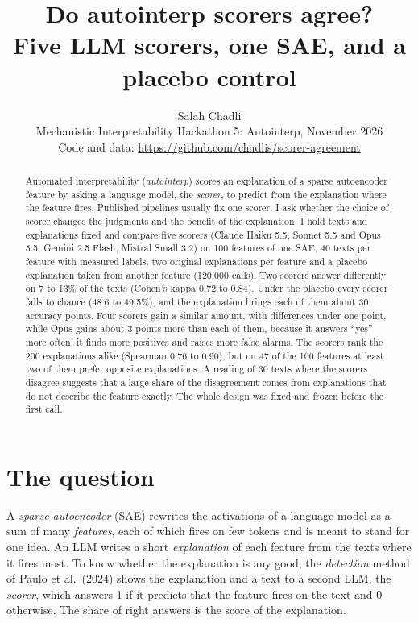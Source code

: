\documentclass[11pt]{article}
\title{Do autointerp scorers agree?\\[0.3em]
\large Five LLM scorers, one SAE, and a placebo control}
\author{Salah Chadli\\ \small Mechanistic Interpretability Hackathon 5: Autointerp, November 2026\\
\small Code and data: \url{https://github.com/chadlis/scorer-agreement}}
\date{}
\begin{document}
\maketitle

\begin{abstract}
\noindent Automated interpretability (\emph{autointerp}) scores an explanation of a
sparse autoencoder feature by asking a language model, the \emph{scorer}, to predict
from the explanation where the feature fires. Published pipelines usually fix one
scorer. I ask whether the choice of scorer changes the judgments and the benefit of
the explanation. I hold texts and explanations fixed and compare five scorers (Claude
Haiku 5.5, Sonnet 5.5 and Opus 5.5, Gemini 2.5 Flash, Mistral Small 3.2) on 100
features of one SAE, 40 texts per feature with measured labels, two original
explanations per feature and a placebo explanation taken from another feature
(120,000 calls). Two scorers answer differently on 7 to 13\% of the texts (Cohen's
kappa 0.72 to 0.84). Under the placebo every scorer falls to chance (48.6 to 49.5\%),
and the explanation brings each of them about 30 accuracy points. Four scorers gain
a similar amount, with differences under one point, while Opus gains about 3 points
more than each of them, because it answers ``yes'' more often: it finds more positives
and raises more false alarms. The scorers rank the 200 explanations alike (Spearman
0.76 to 0.90), but on 47 of the 100 features at least two of them prefer opposite
explanations. A reading of 30 texts where the scorers disagree suggests that a large
share of the disagreement comes from explanations that do not describe the feature
exactly. The whole design was fixed and frozen before the first call.
\end{abstract}

\section{The question}

A \emph{sparse autoencoder} (SAE) rewrites the activations of a language model as a
sum of many \emph{features}, each of which fires on few tokens and is meant to stand
for one idea. An LLM writes a short \emph{explanation} of each feature from the texts
where it fires most. To know whether the explanation is any good, the
\emph{detection} method of Paulo et al.\ (2024) shows the explanation and a text to a
second LLM, the \emph{scorer}, which answers 1 if it predicts that the feature fires
on the text and 0 otherwise. The share of right answers is the score of the
explanation.
\end{document}
